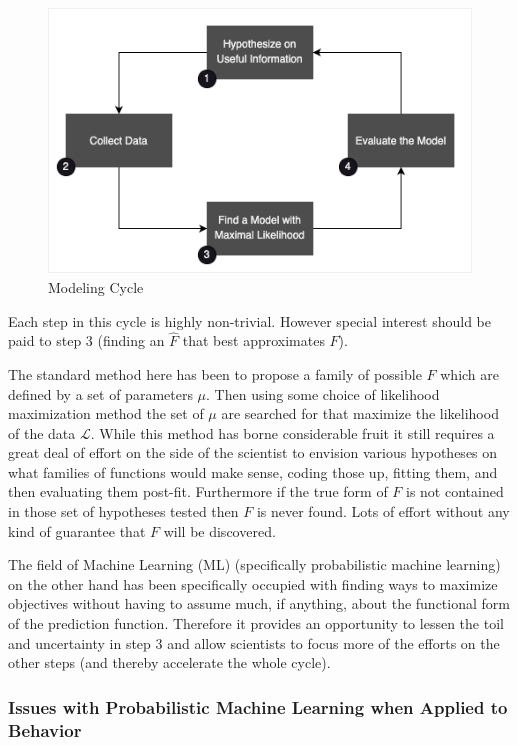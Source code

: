 \documentclass[11pt]{article}
\begin{document}
\begin{figure}[h!] 
  \includegraphics[width=\linewidth]{model_cycle.png}
  \caption{Modeling Cycle}
  \label{fig:model_cycle}
\end{figure}

Each step in this cycle is highly non-trivial. However special interest should be paid to step 3 (finding an $\hat{F}$ that best approximates $F$). 

The standard method here has been to propose a family of possible $F$ which are defined by a set of parameters $\mu$. Then using some choice of likelihood maximization method the set of $\mu$ are searched for that maximize the likelihood of the data $\mathcal{L}$. While this method has borne considerable fruit it still requires a great deal of effort on the side of the scientist to envision various hypotheses on what families of functions would make sense, coding those up, fitting them, and then evaluating them post-fit. Furthermore if the true form of $F$ is not contained in those set of hypotheses tested then $F$ is never found. Lots of effort without any kind of guarantee that $F$ will be discovered.  

The field of Machine Learning (ML) (specifically probabilistic machine learning) on the other hand has been specifically occupied with finding ways to maximize objectives without having to assume much, if anything, about the functional form of the prediction function. Therefore it provides an opportunity to lessen the toil and uncertainty in step 3 and allow scientists to focus more of the efforts on the other steps (and thereby accelerate the whole cycle).

\subsubsection{Issues with Probabilistic Machine Learning when Applied to Behavior}
\end{document}

